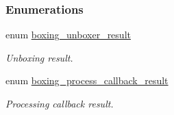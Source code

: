\subsubsection*{Enumerations}
\begin{DoxyCompactItemize}
\item 
enum \hyperlink{group__unboxer_ga6c7b8f994da998dcd78b154856064ca6}{boxing\_\-unboxer\_\-result} 
\begin{DoxyCompactList}\small\item\em Unboxing result. \item\end{DoxyCompactList}\item 
enum \hyperlink{group__unboxer_gae2e6edbb6bac239133f13aa8164984e3}{boxing\_\-process\_\-callback\_\-result} 
\begin{DoxyCompactList}\small\item\em Processing callback result. \item\end{DoxyCompactList}\end{DoxyCompactItemize}
